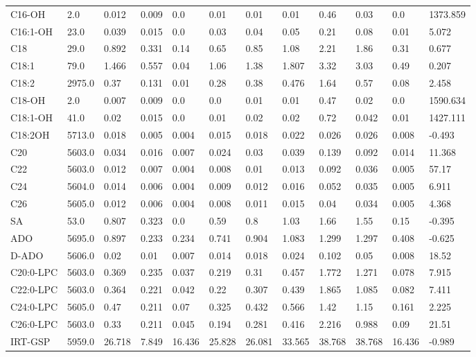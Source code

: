 \begin{tabular}{|l|l|l|l|l|l|l|l|l|l|l|l|}
C16-OH & 2.0 & 0.012 & 0.009 & 0.0 & 0.01 & 0.01 & 0.01 & 0.46 & 0.03 & 0.0 & 1373.859 \\
C16:1-OH & 23.0 & 0.039 & 0.015 & 0.0 & 0.03 & 0.04 & 0.05 & 0.21 & 0.08 & 0.01 & 5.072 \\
C18 & 29.0 & 0.892 & 0.331 & 0.14 & 0.65 & 0.85 & 1.08 & 2.21 & 1.86 & 0.31 & 0.677 \\
C18:1 & 79.0 & 1.466 & 0.557 & 0.04 & 1.06 & 1.38 & 1.807 & 3.32 & 3.03 & 0.49 & 0.207 \\
C18:2 & 2975.0 & 0.37 & 0.131 & 0.01 & 0.28 & 0.38 & 0.476 & 1.64 & 0.57 & 0.08 & 2.458 \\
C18-OH & 2.0 & 0.007 & 0.009 & 0.0 & 0.0 & 0.01 & 0.01 & 0.47 & 0.02 & 0.0 & 1590.634 \\
C18:1-OH & 41.0 & 0.02 & 0.015 & 0.0 & 0.01 & 0.02 & 0.02 & 0.72 & 0.042 & 0.01 & 1427.111 \\
C18:2OH & 5713.0 & 0.018 & 0.005 & 0.004 & 0.015 & 0.018 & 0.022 & 0.026 & 0.026 & 0.008 & -0.493 \\
C20 & 5603.0 & 0.034 & 0.016 & 0.007 & 0.024 & 0.03 & 0.039 & 0.139 & 0.092 & 0.014 & 11.368 \\
C22 & 5603.0 & 0.012 & 0.007 & 0.004 & 0.008 & 0.01 & 0.013 & 0.092 & 0.036 & 0.005 & 57.17 \\
C24 & 5604.0 & 0.014 & 0.006 & 0.004 & 0.009 & 0.012 & 0.016 & 0.052 & 0.035 & 0.005 & 6.911 \\
C26 & 5605.0 & 0.012 & 0.006 & 0.004 & 0.008 & 0.011 & 0.015 & 0.04 & 0.034 & 0.005 & 4.368 \\
SA & 53.0 & 0.807 & 0.323 & 0.0 & 0.59 & 0.8 & 1.03 & 1.66 & 1.55 & 0.15 & -0.395 \\
ADO & 5695.0 & 0.897 & 0.233 & 0.234 & 0.741 & 0.904 & 1.083 & 1.299 & 1.297 & 0.408 & -0.625 \\
D-ADO & 5606.0 & 0.02 & 0.01 & 0.007 & 0.014 & 0.018 & 0.024 & 0.102 & 0.05 & 0.008 & 18.52 \\
C20:0-LPC & 5603.0 & 0.369 & 0.235 & 0.037 & 0.219 & 0.31 & 0.457 & 1.772 & 1.271 & 0.078 & 7.915 \\
C22:0-LPC & 5603.0 & 0.364 & 0.221 & 0.042 & 0.22 & 0.307 & 0.439 & 1.865 & 1.085 & 0.082 & 7.411 \\
C24:0-LPC & 5605.0 & 0.47 & 0.211 & 0.07 & 0.325 & 0.432 & 0.566 & 1.42 & 1.15 & 0.161 & 2.225 \\
C26:0-LPC & 5603.0 & 0.33 & 0.211 & 0.045 & 0.194 & 0.281 & 0.416 & 2.216 & 0.988 & 0.09 & 21.51 \\
IRT-GSP & 5959.0 & 26.718 & 7.849 & 16.436 & 25.828 & 26.081 & 33.565 & 38.768 & 38.768 & 16.436 & -0.989 \\

\end{tabular}
